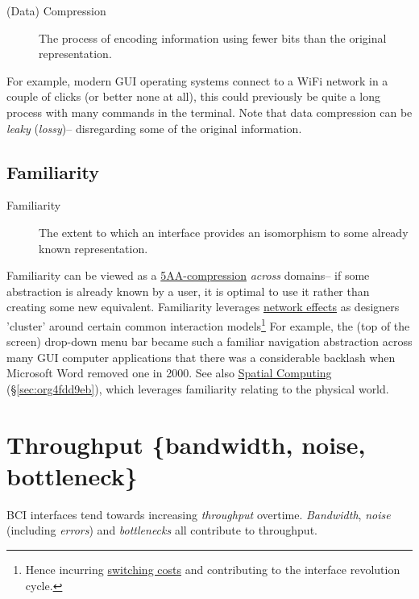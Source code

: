 \documentclass[logo,bsc,singlespacing,parskip]{infthesis}
\begin{document}
\begin{mdframed}
\begin{description}
\item[{(Data) Compression\label{compression}}] The process of encoding information using fewer bits than the original representation.
\end{description}
\end{mdframed}

For example, modern GUI operating systems connect to a WiFi network in a couple of clicks (or better none at all), this could previously be quite a long process with many commands in the terminal.
Note that data compression can be \emph{leaky} (\emph{lossy})-- disregarding some of the original information.

\subsection{Familiarity}
\label{sec:org4ce047a}
\medskip
\begin{mdframed}
\begin{description}
\item[{Familiarity\label{familiarity}}] The extent to which an interface provides an isomorphism to some already known representation.
\end{description}
\end{mdframed}

Familiarity can be viewed as a \hyperref[compression]{5AA-compression} \emph{across} domains-- if some abstraction is already known by a user, it is optimal to use it rather than creating some new equivalent.
Familiarity leverages \hyperref[network effects]{network effects} as designers 'cluster' around certain common interaction models\footnote{Hence incurring \hyperref[switching costs]{switching costs} and contributing to the interface revolution cycle.}
For example, the (top of the screen) drop-down menu bar became such a familiar navigation abstraction across many GUI computer applications that there was a considerable backlash when Microsoft Word removed one in 2000.
See also \hyperref[sec:org4fdd9eb]{Spatial Computing} (\S \ref{sec:org4fdd9eb}), which leverages familiarity relating to the physical world.

\section{Throughput \{bandwidth, noise, bottleneck\}}
\label{sec:orgefd570e}
BCI interfaces tend towards increasing \emph{throughput} overtime. \emph{Bandwidth}, \emph{noise} (including \emph{errors}) and \emph{bottlenecks} all contribute to throughput.
\end{document}
